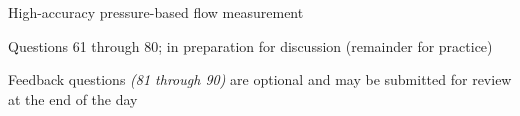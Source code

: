 \vskip 5pt



\vskip 2pt  High-accuracy pressure-based flow measurement

\vskip 2pt \noindent Questions 61 through 80;  in preparation for discussion (remainder for practice)

\vskip 5pt

\noindent Feedback questions {\it (81 through 90)} are optional and may be submitted for review at the end of the day

\vskip 10pt



\vfil \eject

